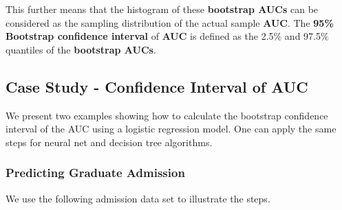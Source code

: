 \documentclass[
]{book}
\begin{document}
This further means that the histogram of these \textbf{bootstrap AUCs} can be considered as the sampling distribution of the actual sample \textbf{AUC}. The \textbf{95\% Bootstrap confidence interval} of \textbf{AUC} is defined as the 2.5\% and 97.5\% quantiles of the \textbf{bootstrap AUCs}.

\hfill\break

\hypertarget{case-study---confidence-interval-of-auc}{%
\subsection{Case Study - Confidence Interval of AUC}\label{case-study---confidence-interval-of-auc}}

We present two examples showing how to calculate the bootstrap confidence interval of the AUC using a logistic regression model. One can apply the same steps for neural net and decision tree algorithms.

\hypertarget{predicting-graduate-admission}{%
\subsubsection{Predicting Graduate Admission}\label{predicting-graduate-admission}}

We use the following admission data set to illustrate the steps.
\end{document}
